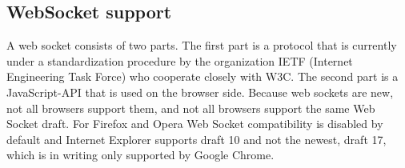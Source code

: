 \subsection{WebSocket support}


A web socket consists of two parts.
The first part is a protocol that is currently under a standardization procedure by the organization IETF (Internet Engineering Task Force) who cooperate closely with W3C\cite{andersen10}. The second part is a JavaScript-API that is used on the browser side\cite{andersen10}. Because web sockets are new, not all browsers support them, and not all browsers support the same Web Socket draft\cite{websocketprotocol11}. For Firefox and Opera Web Socket compatibility is disabled by default\cite{websocketprotocol11} and Internet Explorer supports draft 10 and not the newest, draft 17, which is in writing only supported by Google Chrome\cite{websocketprotocol11}.
